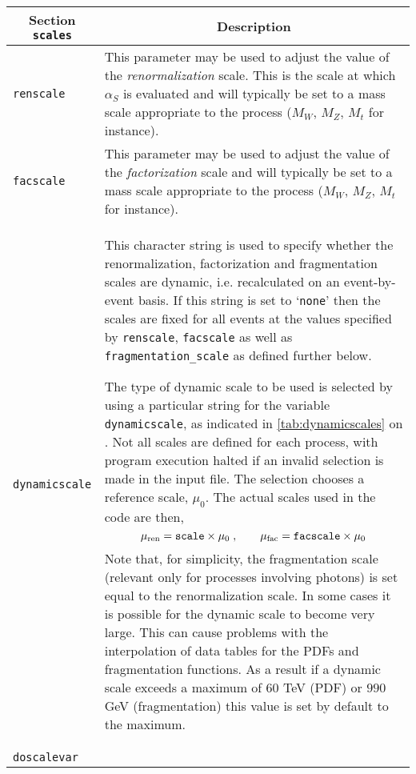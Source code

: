 	\begin{longtable}{p{1.5cm}p{12cm}}
		\toprule
		\multicolumn{1}{c}{{\textbf{Section} \texttt{scales}}} & \multicolumn{1}{c}{{\textbf{Description}}} \\ 
		\midrule
		\texttt{renscale} &
		This parameter may be used to adjust the value
		of the {\it renormalization} scale. This is the scale
		at which $\alpha_S$ is evaluated and will typically be set to
		a mass scale appropriate to the process ($M_W$, $M_Z$, $M_t$ for
		instance). \\
		\texttt{facscale} &
		This parameter may be used to adjust the value
		of the {\it factorization} scale and will typically be set to
		a mass scale appropriate to the process ($M_W$, $M_Z$, $M_t$ for
		instance). \\
		\texttt{dynamicscale} &
		This character string is used to specify whether
		the renormalization, factorization and fragmentation scales are dynamic, i.e. recalculated
		on an event-by-event basis. If this string is set to `{\tt none}' then the scales
		are fixed for all events at the values	specified by {\tt renscale}, {\tt facscale}
		as well as \texttt{fragmentation\_scale} as defined further below.
		
		The type of dynamic scale to be used is selected by using a particular string
		for the variable {\tt dynamicscale}, as indicated in \cref{tab:dynamicscales} on \cpageref{tab:dynamicscales}.
		Not all scales are defined for each process, with program execution halted if
		an invalid selection is made in the input file.
		The selection chooses a reference scale, $\mu_0$. The actual scales used in
		the code are then,
		\begin{equation}
		\mu_{\rm ren} = {\tt scale} \times \mu_0 \;, \qquad
		\mu_{\rm fac} = {\tt facscale} \times \mu_0
		\label{eq:dynscale}
		\end{equation}
		Note that, for simplicity, the fragmentation scale (relevant only for processes
		involving photons) is set equal to the renormalization scale.
		In some cases it is possible for the dynamic scale to become very large. This can cause problems 
		with the interpolation of data tables for the PDFs and fragmentation functions. As a result if a dynamic scale 
		exceeds a maximum of $60$ TeV (PDF) or $990$ GeV (fragmentation) this value is set by default to the maximum. 	
		\\
		\texttt{doscalevar} &
		

\end{longtable}
